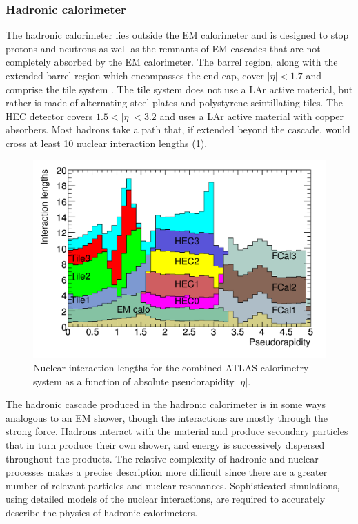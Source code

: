 
\subsubsection{Hadronic calorimeter}

The hadronic calorimeter lies outside the \ac{EM} calorimeter and is designed to stop protons and neutrons as well as the remnants of \ac{EM} cascades that are not completely absorbed by the \ac{EM} calorimeter.
The barrel region, along with the extended barrel region which encompasses the end-cap, cover $|\eta| < 1.7$ and comprise the tile system \cite{ATLAS:1996aa}.
The tile system does not use a \ac{LAr} active material, but rather is made of alternating steel plates and polystyrene scintillating tiles.
The \ac{HEC} detector covers $1.5 < |\eta| < 3.2$ and uses a \ac{LAr} active material with copper absorbers.
Most hadrons take a path that, if extended beyond the cascade, would cross at least 10 nuclear interaction lengths (\cref{fig:atlas_calo_nuclear_int_length}).

\begin{figure}[t]
\includegraphics{calo_nuclear_int_length.pdf}
\caption{Nuclear interaction lengths for the combined ATLAS calorimetry system as a function of absolute pseudorapidity $|\eta|$.}
\label{fig:atlas_calo_nuclear_int_length}
\end{figure}

The hadronic cascade produced in the hadronic calorimeter is in some ways analogous to an \ac{EM} shower, though the interactions are mostly through the strong force.
Hadrons interact with the material and produce secondary particles that in turn produce their own shower, and energy is successively dispersed throughout the products.
The relative complexity of hadronic and nuclear processes makes a precise description more difficult since there are a greater number of relevant particles and nuclear resonances.
Sophisticated \mc simulations, using detailed models of the nuclear interactions, are required to accurately describe the physics of hadronic calorimeters.

